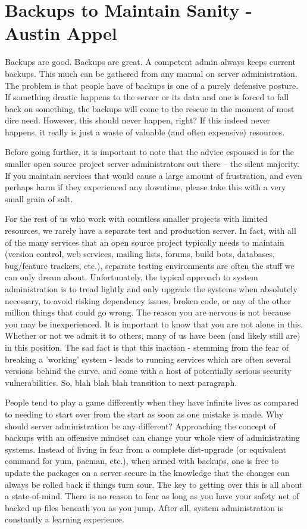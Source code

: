 \chapter{Backups to Maintain Sanity - Austin Appel}

Backups are good. Backups are great. A competent admin always keeps current
backups.  This much can be gathered from any manual on server administration.
The problem is that people have of backups is one of a purely defensive posture.
If something drastic happens to the server or its data and one is forced to fall
back on something, the backups will come to the rescue in the moment of most
dire need. However, this should never happen, right?  If this indeed never
happens, it really is just a waste of valuable (and often expensive) resources.

Before going further, it is important to note that the advice espoused is for
the smaller open source project server administrators out there – the silent
majority. If you maintain services that would cause a large amount of
frustration, and even perhaps harm if they experienced any downtime, please take
this with a very small grain of salt.

For the rest of us who work with countless smaller projects with limited
resources, we rarely have a separate test and production server. In fact, with
all of the many services that an open source project typically needs to maintain
(version control, web services, mailing lists, forums, build bots, databases,
bug/feature trackers, etc.), separate testing environments are often the stuff
we can only dream about. Unfortunately, the typical approach to system
administration is to tread lightly and only upgrade the systems when absolutely
necessary, to avoid risking dependency issues, broken code, or any of the other
million things that could go wrong. The reason you are nervous is not because
you may be inexperienced. It is important to know that you are not alone in
this. Whether or not we admit it to others, many of us have been (and likely
still are) in this position. The sad fact is that this inaction - stemming from
the fear of breaking a 'working' system - leads to running services which are
often several versions behind the curve, and come with a host of potentially
serious security vulnerabilities. So, blah blah blah transition to next
paragraph.

People tend to play a game differently when they have infinite lives as compared
to needing to start over from the start as soon as one mistake is made. Why
should server administration be any different? Approaching the concept of
backups with an offensive mindset can change your whole view of administrating
systems. Instead of living in fear from a complete dist-upgrade (or equivalent
command for yum, pacman, etc.), when armed with backups, one is free to update
the packages on a server secure in the knowledge that the changes can always be
rolled back if things turn sour. The key to getting over this is all about a
state-of-mind. There is no reason to fear as long as you have your safety net of
backed up files beneath you as you jump. After all, system administration is
constantly a learning experience.

